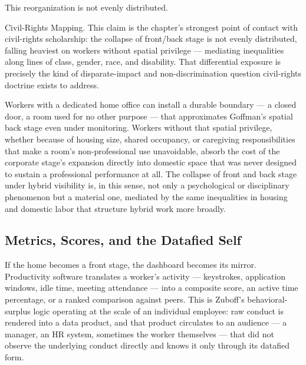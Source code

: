 \documentclass[10pt]{article}
\begin{document}
This reorganization is not evenly distributed.

\begin{callout}{Civil-Rights Mapping.}
This claim is the chapter's strongest point of contact with civil-rights scholarship: the collapse of front/back stage is not evenly distributed, falling heaviest on workers without spatial privilege --- mediating inequalities along lines of class, gender, race, and disability. That differential exposure is precisely the kind of disparate-impact and non-discrimination question civil-rights doctrine exists to address.
\end{callout}

Workers with a dedicated home office can install a durable boundary --- a closed door, a room used for no other purpose --- that approximates Goffman's spatial back stage even under monitoring. Workers without that spatial privilege, whether because of housing size, shared occupancy, or caregiving responsibilities that make a room's non-professional use unavoidable, absorb the cost of the corporate stage's expansion directly into domestic space that was never designed to sustain a professional performance at all. The collapse of front and back stage under hybrid visibility is, in this sense, not only a psychological or disciplinary phenomenon but a material one, mediated by the same inequalities in housing and domestic labor that structure hybrid work more broadly.

\subsection{Metrics, Scores, and the Datafied Self}

If the home becomes a front stage, the dashboard becomes its mirror. Productivity software translates a worker's activity --- keystrokes, application windows, idle time, meeting attendance --- into a composite score, an active time percentage, or a ranked comparison against peers. This is Zuboff's behavioral-surplus logic operating at the scale of an individual employee: raw conduct is rendered into a data product, and that product circulates to an audience --- a manager, an HR system, sometimes the worker themselves --- that did not observe the underlying conduct directly and knows it only through its datafied form.
\end{document}
